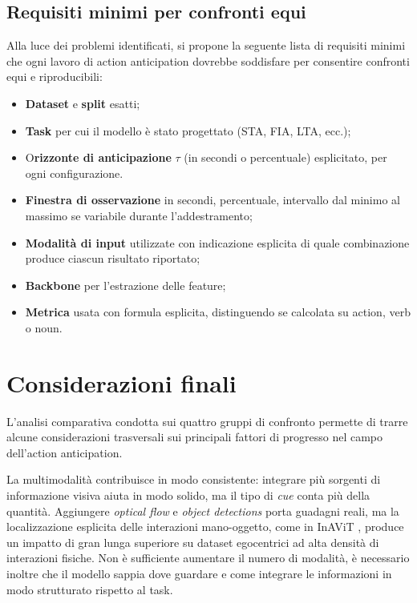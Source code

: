 \subsection{Requisiti minimi per confronti equi}
Alla luce dei problemi identificati, si propone la seguente lista di requisiti minimi che ogni lavoro di action anticipation dovrebbe soddisfare per consentire confronti equi e riproducibili:
\begin{itemize}
    \item \textbf{Dataset} e \textbf{split} esatti;
    \item \textbf{Task} per cui il modello è stato progettato (STA, FIA, LTA, ecc.);
    \item O\textbf{rizzonte di anticipazione} $\tau$ (in secondi o percentuale) esplicitato, per ogni configurazione.
    \item \textbf{Finestra di osservazione} in secondi, percentuale, intervallo dal minimo al massimo se variabile durante l'addestramento;
    \item \textbf{Modalità di input} utilizzate con indicazione esplicita di quale combinazione produce ciascun risultato riportato;
    \item \textbf{Backbone} per l'estrazione delle feature;
    \item \textbf{Metrica} usata con formula esplicita, distinguendo se calcolata su action, verb o noun.
\end{itemize}

\section{Considerazioni finali}
L'analisi comparativa condotta sui quattro gruppi di confronto permette di trarre alcune considerazioni trasversali sui principali fattori di progresso nel campo dell’action anticipation.

La multimodalità contribuisce in modo consistente: integrare più sorgenti di informazione visiva aiuta in modo solido, ma il tipo di \textit{cue} conta più della quantità. Aggiungere \textit{optical flow} e \textit{object detections} porta guadagni reali, ma la localizzazione esplicita delle interazioni mano-oggetto, come in InAViT \cite{roy2024interaction}, produce un impatto di gran lunga superiore su dataset egocentrici ad alta densità di interazioni fisiche. Non è sufficiente aumentare il numero di modalità, è necessario inoltre che il modello sappia dove guardare e come integrare le informazioni in modo strutturato rispetto al task.

